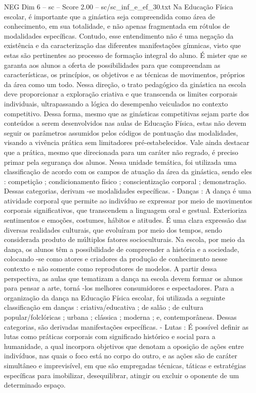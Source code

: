 \begin{textsample}{NEG Dim 6 – sc – Score 2.00 – sc/sc\_inf\_e\_ef\_30.txt}
Na Educação Física escolar, é importante que a ginástica seja compreendida como área de conhecimento, em sua totalidade, e não apenas fragmentada em rótulos de modalidades específicas.
Contudo, esse entendimento não é uma negação da existência e da caracterização das diferentes manifestações gímnicas, visto que estas são pertinentes ao processo de formação integral do aluno.
É mister que se garanta aos alunos a oferta de possibilidades para que compreendam as características, os princípios, os objetivos e as técnicas de movimentos, próprios da área como um todo.
Nessa direção, o trato pedagógico da ginástica na escola deve proporcionar a exploração criativa e que transcenda os limites corporais individuais, ultrapassando a lógica do desempenho veiculados no contexto competitivo.
Dessa forma, mesmo que as ginásticas competitivas sejam parte dos conteúdos a serem desenvolvidos nas aulas de Educação Física, estas não devem seguir os parâmetros assumidos pelos códigos de pontuação das modalidades, visando a vivência prática sem limitadores pré-estabelecidos.
Vale ainda destacar que a prática, mesmo que direcionada para um caráter não regrado, é preciso primar pela segurança dos alunos.
Nessa unidade temática, foi utilizada uma classificação de acordo com os campos de atuação da área da ginástica, sendo eles : competição ; condicionamento físico ; conscientização corporal ; demonstração.
Dessas categorias, derivam -se modalidades específicas. - Danças : A dança é uma atividade corporal que permite ao indivíduo se expressar por meio de movimentos corporais significativos, que transcendem a linguagem oral e gestual.
Exterioriza sentimentos e emoções, costumes, hábitos e atitudes.
É uma clara expressão das diversas realidades culturais, que evoluíram por meio dos tempos, sendo considerada produto de múltiplos fatores socioculturais.
Na escola, por meio da dança, os alunos têm a possibilidade de compreender a história e a sociedade, colocando -se como atores e criadores da produção de conhecimento nesse contexto e não somente como reprodutores de modelos.
A partir dessa perspectiva, as aulas que tematizam a dança na escola devem formar os alunos para pensar a arte, torná -los melhores consumidores e espectadores.
Para a organização da dança na Educação Física escolar, foi utilizada a seguinte classificação em danças : criativa/educativa ; de salão ; de cultura popular/folclóricas ; urbana ; clássica ; moderna ; e, contemporâneas.
Dessas categorias, são derivadas manifestações específicas. - Lutas : É possível definir as lutas como práticas corporais com significado histórico e social para a humanidade, a qual incorpora objetivos que denotam a oposição de ações entre indivíduos, nas quais o foco está no corpo do outro, e as ações são de caráter simultâneo e imprevisível, em que são empregadas técnicas, táticas e estratégias específicas para imobilizar, desequilibrar, atingir ou excluir o oponente de um determinado espaço.

\end{textsample}
